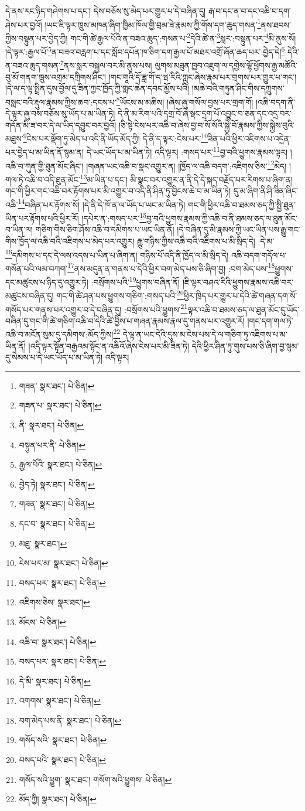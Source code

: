 དེ་ནས་རང་ཉིད་གཤེགས་པ་དང་། དེས་བཅོས་སུ་མེད་པར་གྱུར་པ་དེ་བཞིན་དུ། རྒ་བ་དང་ན་བ་དང་འཆི་བ་དག་ཤེས་པར་བྱའོ། །ཡང་ཇི་ལྟར་ཁྲུས་མཁན་ཞིག་ཁྱིམ་ཁོལ་གྱི་བྲམ་ཟེ་རྣམས་ཀྱི་གོས་དག་ཆུད་གསན་\footnote{གཟན་  སྣར་ཐང་།  པེ་ཅིན། }ནས་ཐབས་ཀྱིས་བསྟུན་པར་བྱེད་ཀྱི། གང་གི་ཚེ་རྒྱལ་པོའི་ན་བཟའ་ཆུད་:གསན་པ་\footnote{གཟན་པ་  སྣར་ཐང་།  པེ་ཅིན། }དེའི་ཚེ་ན་\footnote{ནི་  སྣར་ཐང་།  པེ་ཅིན། }སླར་:བསྟུན་པར་\footnote{བསྟུན་པར་ནི་  པེ་ཅིན། }མི་ནུས་སོ། །དེ་ལྟར་:རྒྱལ་པོ་\footnote{རྒྱལ་པོའི་  སྣར་ཐང་།  པེ་ཅིན། }ན་བཟའ་བརླག་པ་དང་སློབ་དཔོན་ཁ་ཅིག་དག་རྒྱལ་པོ་མཐར་འགྲོ་ཞོན་ཆད་པར་:བྱེད་དེ།\footnote{བྱེད་ཏེ།  སྣར་ཐང་།  པེ་ཅིན། } དེའི་ན་བཟའ་ཆུད་གསན་\footnote{གཟན་  སྣར་ཐང་།  པེ་ཅིན། }ནས་སླར་བསྐྱལ་བར་མི་ནུས་པས། ལུགས་མཐུན་ཁྱབ་འཇུག་ལ་དགྱེས་ལྷོ་ཕྱོགས་རྒྱ་མཚོའི་བུ་མོ་གནག་ཁྲུས་འགྲམ་དཀྲིགས་ཤིང་། །གང་གཱའི་དོ་ཟླ་གོ་ད་ཝ་རིའི་ཀླུང་ཞེས་རྣམ་པར་གྲགས་པར་གྱུར་པ་གང་། །དེ་ལ་ད་ལྟ་སྤྲིན་དུས་བྱོལ་དུ་ཟིན་ཀྱང་ཁྱོད་ཀྱི་གླང་ཆེན་དབང་མྱོས་པའི། །མཆེ་བའི་གཏུན་ཤིང་གིས་དཀྲུགས་བསླང་བའི་རྡུལ་རྣམས་ཀྱིས་ཆབ་:དངས་པ་\footnote{དང་བ་  སྣར་ཐང་།  པེ་ཅིན། }ཡོངས་མ་མཆིས། །ཞེས་ཞུ་གསོལ་བྱས་པར་གྲག་གོ། །འཆི་བདག་ནི་དེ་ལྟར་ཞུ་བས་བཅོས་སུ་ཡོད་པ་མ་ཡིན་ཏེ། དེ་ནི་མ་རིག་པའི་དགྲ་བོ་ཞེ་སྡང་དྲག་པོ་འབྱུང་བ་ཅན་དང་འདྲ་བར་གདོན་མི་ཟ་བར་དེ་ལ་ཡིད་དབྱུང་བར་བྱའོ། །ཅི་སྟེ་ངེས་པར་འཆི་བ་ཞེས་བྱ་བ་སོ་སོའི་སྐྱེ་བོ་རྣམས་ཀྱིས་སྐྱེས་བུའི་མཐུས་\footnote{མཐུ་  སྣར་ཐང་། }ངེས་པར་ལྡོག་ཏུ་མེད་པ་འདི་ནི་ཡོད་མོད་ཀྱི། དེ་ནི་ད་ལྟར་:ངེས་པར་\footnote{ངེས་པར་མ་  སྣར་ཐང་།  པེ་ཅིན། }ཟིན་པའི་ཕྱིར་འཇིགས་པ་འདྲེན་པར་བྱེད་པ་མ་ཡིན་ནོ་སྙམ་ན། དེ་ཡང་ཡོད་པ་མ་ཡིན་ཏེ། འདི་ལྟར། :གསད་པར་\footnote{བསད་པར་  སྣར་ཐང་།  པེ་ཅིན། }བྱ་བའི་ཕྱུགས་རྣམས་ལྟར། །འཆི་བ་ཀུན་གྱི་ཐུན་མོང་ཞིང་། །གཞན་ཡང་འཆི་བ་སྣང་འགྱུར་ན། །ཁྱོད་ལ་འཆི་བདག་:འཇིགས་ཅིས་\footnote{འཇིགས་ཅེས་  སྣར་ཐང་། }མེད། །གལ་ཏེ་འཆི་བ་འདི་ཐུན་མོང་\footnote{མོངས་  པེ་ཅིན། }མ་ཡིན་པ་དང་། མི་སྣང་བར་འགྱུར་ན་ནི་དེ་དེ་སྐད་བརྗོད་པར་རིགས་པ་ཞིག་ན། གང་གི་ཕྱིར་གང་འཆི་བར་རྟོགས་པར་མི་འགྱུར་བ་འདི་ནི་ཤིན་ཏུ་བྱིངས་ཆེ་བ་མ་ཡིན་ཏེ། དུ་མ་ཞིག་ནི་ཤི་ཟིན་ཞིང་འཆི་\footnote{འཆི་བ་  སྣར་ཐང་།  པེ་ཅིན། }བཞིན་པར་རྟོགས་སོ། །དེ་ནི་དེ་ཁོ་ན་ལ་ཡོད་པ་ཡང་མ་ཡིན་ཏེ། གང་གི་ཕྱིར་འཆི་བ་ཐམས་ཅད་ཀྱི་སྤྱི་ཐུན་ཡིན་པར་རྟོགས་པའི་ཕྱིར་རོ། །དཔེར་ན་:གསད་པར་\footnote{བསད་པར་  སྣར་ཐང་།  པེ་ཅིན། }བྱ་བའི་ཕྱུགས་རྣམས་ཀྱི་འཆི་བ་ནི་ཐམས་ཅད་ལ་ཐུན་མོང་བ་ཡིན་ལ། གཅིག་གིས་ཅིག་ཤོས་འཆི་བ་དམིགས་པ་ཡང་ཡིན་ནོ། །དེ་བཞིན་དུ་མི་རྣམས་ཀྱི་ཡང་ཡིན་པས་རྒྱུ་གང་གིས་ཁྱོད་ལ་འཆི་བའི་འཇིགས་པ་མེད་པར་འགྱུར། རྒྱུ་གཉིས་ཀྱིས་འཆི་བའི་འཇིགས་པ་མི་སྲིད་དེ། :དེ་མ་\footnote{དེ་མི་  སྣར་ཐང་།  པེ་ཅིན། }དམིགས་པ་དང་དེ་ལས་འདས་པ་ཡིན་པ་ཞིག་ན། གཉིས་པོ་འདི་ནི་ཁྱོད་ལ་མི་སྲིད་དེ། འཆི་བདག་གདོལ་པ་གསོན་པའི་ལམ་བཀག་\footnote{འགགས་  སྣར་ཐང་།  པེ་ཅིན། }ནས་མདུན་ན་གནས་པ་དེའི་ཕྱིར་བག་མེད་པས་ཅི་ཞིག་བྱ། :བག་མེད་པས་\footnote{བག་མེད་པས་ནི་  སྣར་ཐང་།  པེ་ཅིན། }ཕྱུགས་དང་མཚུངས་པ་ཉིད་དུ་འགྱུར་ཏེ། :བསྲོགས་པའི་\footnote{གསོད་སའི་  སྣར་ཐང་།  པེ་ཅིན། }ཕྱུགས་བཞིན་ནོ། །ཇི་ལྟར་བཤའ་རིའི་ཕྱུགས་རྣམས་འཆི་བར་མཚུངས་བཞིན་དུ། གང་གི་ཚེ་ཤན་པས་ཕྱུགས་གཅིག་:གསད་པའི་\footnote{བསད་པའི་  སྣར་ཐང་།  པེ་ཅིན། }ཕྱིར་ཁྲིད་པར་གྱུར་པ་དེའི་ཚེ་གཞན་དག་སོ་གསོད་པར་གནས་པར་འགྱུར་བ་དེ་བཞིན་དུ། :བསྲོགས་པའི་ཕྱུགས་\footnote{གསོད་སའི་ཕྱུག་  སྣར་ཐང་། གསོག་སའི་ཕྱུགས་  པེ་ཅིན། }ལྟར་འཆི་བ་ཐམས་ཅད་ལ་ཐུན་མོང་དུ་ཡོད་བཞིན་དུ་གང་གི་ཚེ་གཅིག་འཆི་བ་དེའི་ཚེ་བྱིས་པ་གཞན་རྣམས་རྣལ་དུ་གནས་པར་འགྱུར་རོ། །གང་དག་གལ་ཏེ་འཆི་བ་མངོན་སུམ་དུ་དམིགས་:མོད་ཀྱིས།\footnote{མོད་ཀྱི།  སྣར་ཐང་།  པེ་ཅིན། } དེ་ལྟ་ན་ཡང་དེའི་དུས་མ་ངེས་པས་དེ་ལ་གཅིག་ཏུ་འཇིགས་པ་མ་ཡིན་ནོ། །འདི་ལྟར་སྟོན་བརྒྱའམ་སྟོང་ན་འཆིའོ་ཞེས་ངེས་པར་མི་ཟིན་ཏེ། དེའི་ཕྱིར་ཤིན་ཏུ་གུས་པས་ཅི་ཞིག་བྱ་སྙམ་དུ་སེམས་པ་དེ་ཡང་ཡོད་པ་མ་ཡིན་ཏེ། འདི་ལྟར། 